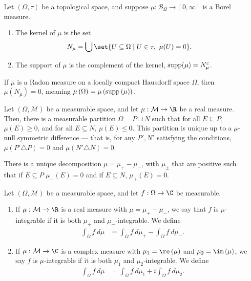 \begin{definition}
  Let $\left(\Omega,\tau\right)$ be a topological space, and suppose $\mu: \mathcal{B}_{\Omega}\rightarrow [0,\infty]$ is a Borel measure.
  \begin{enumerate}[(1)]
    \item The kernel of $\mu$ is the set
      \begin{align*}
        N_{\mu} &= \bigcup\set{U\subseteq \Omega\mid U\in\tau,~\mu(U) = 0}.
      \end{align*}
    \item The support of $\mu$ is the complement of the kernel, $\operatorname{supp}(\mu) = N_{\mu}^{c}$.
  \end{enumerate}
\end{definition}
\begin{fact}
  If $\mu$ is a Radon measure on a locally compact Hausdorff space $\Omega$, then $\mu\left(N_{\mu}\right) = 0$, meaning $\mu\left(\Omega\right) = \mu\left(\operatorname{supp}\left(\mu\right)\right)$.
\end{fact}

\begin{theorem}
  Let $\left(\Omega,\mathcal{M}\right)$ be a measurable space, and let $\mu: \mathcal{M}\rightarrow \R$ be a real measure. Then, there is a measurable partition $\Omega = P\sqcup N$ such that for all $E\subseteq P$, $\mu(E) \geq 0$, and for all $E\subseteq N$, $\mu(E) \leq 0$. This partition is unique up to a $\mu$-null symmetric difference --- that is, for any $P',N'$ satisfying the conditions, $\mu\left(P'\triangle P\right) = 0$ and $\mu\left(N'\triangle N\right) = 0$.\newline

  There is a unique decomposition $\mu = \mu_{+} - \mu_{-}$, with $\mu_{\pm}$ that are positive such that if $E\subseteq P$ $\mu_{-}\left(E\right) = 0$ and if $E\subseteq N$, $\mu_{+}\left(E\right) = 0$.
\end{theorem}
\begin{definition}
  Let $\left(\Omega,\mathcal{M}\right)$ be a measurable space, and let $f: \Omega\rightarrow \C$ be measurable.
  \begin{enumerate}[(1)]
    \item If $\mu: \mathcal{M}\rightarrow \R$ is a real measure with $\mu = \mu_{+} - \mu_{-}$, we say that $f$ is $\mu$-integrable if it is both $\mu_{+}$ and $\mu_{-}$-integrable. We define
      \begin{align*}
        \int_{\Omega}^{} f\:d\mu &= \int_{\Omega}^{} f\:d\mu_{+} - \int_{\Omega}^{} f\:d\mu_{-}.
      \end{align*}
    \item If $\mu:\mathcal{M}\rightarrow \C$ is a complex measure with $\mu_{1} = \re\left(\mu\right)$ and $\mu_{2} = \im\left(\mu\right)$, we say $f$ is $\mu$-integrable if it is both $\mu_{1}$ and $\mu_{2}$-integrable. We define
      \begin{align*}
        \int_{\Omega}^{} f\:d\mu &= \int_{\Omega}^{} f\:d\mu_{1} + i\int_{\Omega}^{} f\:d\mu_{2}.
      \end{align*}
  \end{enumerate}
\end{definition}


